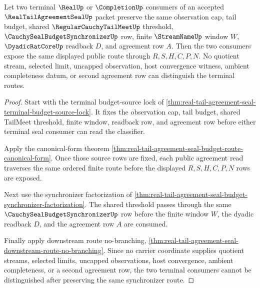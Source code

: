 \begin{theorem}
\label{thm:real-tail-agreement-seal-budget-synchronizer-route-determinacy}
Let two terminal $\RealUp$ or $\CompletionUp$ consumers of an accepted $\RealTailAgreementSealUp$ packet preserve the same observation cap, tail budget, shared $\RegularCauchyTailMeetUp$ threshold, $\CauchySealBudgetSynchronizerUp$ row, finite $\StreamNameUp$ window $W$, $\DyadicRatCoreUp$ readback $D$, and agreement row $A$. Then the two consumers expose the same displayed public route through $R,S,H,C,P,N$. No quotient stream, selected limit, uncapped observation, host convergence witness, ambient completeness datum, or second agreement row can distinguish the terminal routes.
\end{theorem}
\begin{proof}
Start with the terminal budget-source lock of \autoref{thm:real-tail-agreement-seal-terminal-budget-source-lock}. It fixes the observation cap, tail budget, shared TailMeet threshold, finite window, readback row, and agreement row before either terminal seal consumer can read the classifier.

Apply the canonical-form theorem \autoref{thm:real-tail-agreement-seal-budget-route-canonical-form}. Once those source rows are fixed, each public agreement read traverses the same ordered finite route before the displayed $R,S,H,C,P,N$ rows are exposed.

Next use the synchronizer factorization of \autoref{thm:real-tail-agreement-seal-budget-synchronizer-factorization}. The shared threshold passes through the same $\CauchySealBudgetSynchronizerUp$ row before the finite window $W$, the dyadic readback $D$, and the agreement row $A$ are consumed.

Finally apply downstream route no-branching, \autoref{thm:real-tail-agreement-seal-downstream-route-no-branching}. Since no carrier coordinate supplies quotient streams, selected limits, uncapped observations, host convergence, ambient completeness, or a second agreement row, the two terminal consumers cannot be distinguished after preserving the same synchronizer route.
\end{proof}

